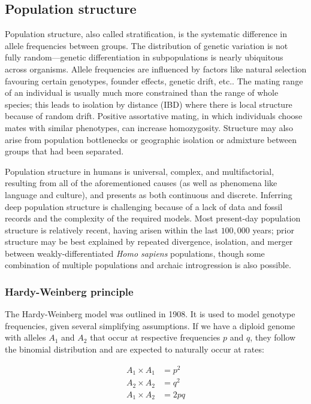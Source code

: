 \subsection{Population structure}

Population structure, also called stratification, is the systematic difference in allele frequencies between groups. The distribution of genetic variation is not fully random---genetic differentiation in subpopulations is nearly ubiquitous across organisms. Allele frequencies are influenced by factors like natural selection favouring certain genotypes, founder effects, genetic drift, etc.\citep{hartl2007principles_6}. The mating range of an individual is usually much more constrained than the range of whole species; this leads to isolation by distance (IBD) where there is local structure because of random drift\citep{wright_isolation_1943}. Positive assortative mating, in which individuals choose mates with similar phenotypes, can increase homozygosity\citep{hartl2007principles_6}. Structure may also arise from population bottlenecks or geographic isolation\citep{crow_kimura_1970_3} or admixture between groups that had been separated\citep{crow_kimura_1970_9}. 

Population structure in humans is universal, complex, and multifactorial, resulting from all of the aforementioned causes (as well as phenomena like language\citep{barbujani_zones_1990} and culture\citep{campbell_evolution_2010}), and presents as both continuous and discrete\citep{peter_geometric_2022}. Inferring deep population structure is challenging because of a lack of data and fossil records and the complexity of the required models. Most present-day population structure is relatively recent, having arisen within the last $100,000$ years; prior structure may be best explained by repeated divergence, isolation, and merger between weakly-differentiated \textit{Homo sapiens} populations, though some combination of multiple populations and archaic introgression is also possible\citep{ragsdale_weakly_2023}.

\subsubsection{Hardy-Weinberg principle}

The Hardy-Weinberg model was outlined in 1908. It is used to model genotype frequencies, given several simplifying assumptions\citep{hartl2007principles_2}. If we have a diploid genome with alleles $A_{1}$ and $A_{2}$ that occur at respective frequencies $p$ and $q$, they follow the binomial distribution and are expected to naturally occur at rates:
\begin{spacing}{1}
\begin{align*} 
A_{1} \times A_{1} &= p^{2}\\
A_{2} \times A_{2} &= q^{2}\\
A_{1} \times A_{2} &= 2pq
\end{align*} 
\end{spacing}

